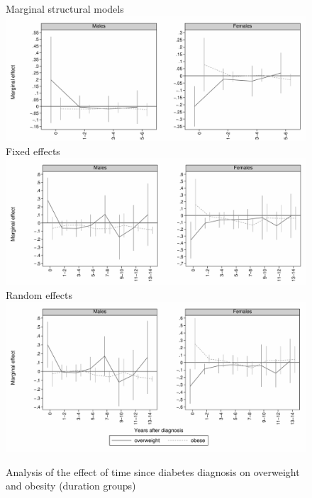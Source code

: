 \begin{figure}
\begin{center}
\caption{\label{fig:obesity_duration_g} Analysis of the effect of time since diabetes diagnosis on overweight and obesity (duration groups)}
Marginal structural models
\includegraphics[width=\linewidth]{Chapter5/Figures/mi_msm_l_all_obese.pdf}
Fixed effects
\includegraphics[width=\linewidth]{Chapter5/Figures/mi_obese_fe.pdf}
Random effects
\includegraphics[width=\linewidth]{Chapter5/Figures/mi_obese_re.pdf}
\end{center}
\end{figure}
\clearpage \newpage 
\cleardoublepage
          
